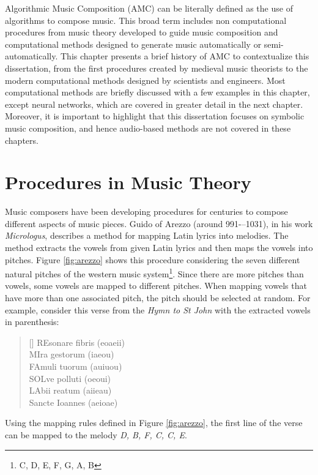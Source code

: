 Algorithmic Music Composition (AMC) can be literally defined as the use of algorithms to compose music. This broad term includes non computational procedures from music theory developed to guide music composition and computational methods designed to generate music automatically or semi-automatically. This chapter presents a brief history of AMC to contextualize this dissertation, from the first procedures created by medieval music theorists to the modern computational methods designed by scientists and engineers. Most computational methods are briefly discussed with a few examples in this chapter, except neural networks, which are covered in greater detail in the next chapter. Moreover, it is important to highlight that this dissertation focuses on symbolic music composition, and hence audio-based methods are not covered in these chapters.

\section{Procedures in Music Theory}

Music composers have been developing procedures for centuries to compose different aspects of music pieces. Guido of Arezzo (around 991-–1031), in his work \textit{Micrologus}, describes a method for mapping Latin lyrics into melodies. The method extracts the vowels from given Latin lyrics and then maps the vowels into pitches. Figure \ref{fig:arezzo} shows this procedure considering the seven different natural pitches of the western music system\footnote{C, D, E, F, G, A, B}. Since there are more pitches than vowels, some vowels are mapped to different pitches. When mapping vowels that have more than one associated pitch, the pitch should be selected at random. For example, consider this verse from the \textit{Hymn to St John} with the extracted vowels in parenthesis:

\settowidth{\versewidth}{UT queant laxis,}
\begin{verse}[\versewidth]
    REsonare fibris (eoaeii) \\
    MIra gestorum (iaeou) \\
    FAmuli tuorum (auiuou) \\
    SOLve polluti (oeoui)\\
    LAbii reatum  (aiieau)\\
    Sancte Ioannes (aeioae)
\end{verse}

Using the mapping rules defined in Figure \ref{fig:arezzo}, the first line of the verse can
be mapped to the melody \textit{D, B, F, C, C, E}.

